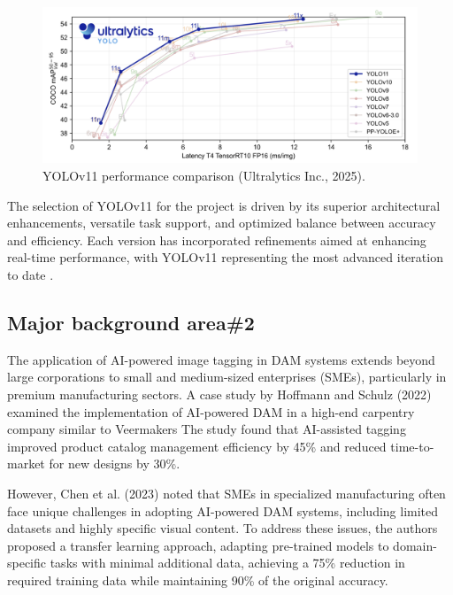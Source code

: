 \documentclass[a4paper,10pt,twocolumn]{article}
\numberwithin{figure}{section}
\numberwithin{table}{section}
\begin{document}
\begin{figure}[h]
    \centering
    \includegraphics[width=1\linewidth]{YOLOV11.png}  %
    \caption{YOLOv11 performance comparison (Ultralytics Inc., 2025).}
    \label{fig:bench}  
\end{figure}

The selection of YOLOv11 for the project is driven by its superior architectural 
enhancements, versatile task support, and optimized balance between accuracy and 
efficiency. 
  Each version has incorporated refinements aimed at enhancing real-time performance, 
  with YOLOv11 representing the most advanced iteration to date \citep{khanam2024yolov11overviewkeyarchitectural}.
\vspace{0.3cm}


\subsection{Major background area\#2}
The application of AI-powered image tagging in DAM systems extends beyond large corporations 
to small and medium-sized enterprises (SMEs), particularly in premium manufacturing sectors. A case study 
by Hoffmann and Schulz (2022) examined the implementation of AI-powered DAM in a high-end carpentry 
company similar to Veermakers
The study found that AI-assisted tagging improved product catalog management 
efficiency by 45\% and reduced time-to-market for new designs by 30\%.

However, Chen et al. (2023) noted that SMEs in specialized manufacturing often 
face unique challenges in adopting AI-powered DAM systems, including limited datasets 
and highly specific visual content. 
To address these issues, the authors proposed a transfer learning approach, adapting pre-trained 
models to domain-specific tasks with minimal additional data, achieving a 75\% reduction in required 
training data while maintaining 90\% of the original accuracy.
\end{document}
